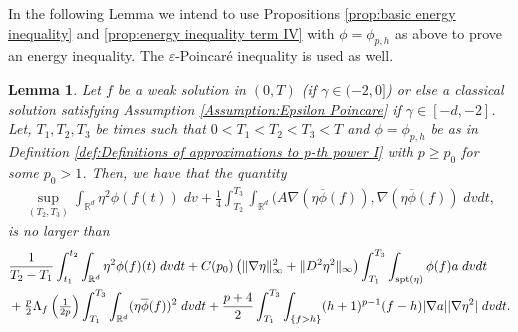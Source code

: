 \documentclass[12pt,american]{amsart}
\numberwithin{equation}{section}
\theoremstyle{plain}
\newtheorem{lem}[thm]{Lemma}
\theoremstyle{definition}                  %
\begin{document}
  In the following Lemma we intend to use Propositions \ref{prop:basic energy inequality} and \ref{prop:energy inequality term IV} with $\phi = \phi_{p,h}$ as above to prove an energy inequality. The $\varepsilon$-Poincar\'e inequality is used as well.
  \begin{lem}\label{lem:energy inequality with bad term} 
    Let $f$ be a weak solution in $(0,T)$ (if $\gamma \in (-2,0]$) or else a classical solution satisfying Assumption \ref{Assumption:Epsilon Poincare} if $\gamma \in [-d,-2]$. Let, $T_1,T_2,T_3$ be times such that $0<T_1<T_2<T_3<T$ and $\phi=\phi_{p,h}$ be as in Definition \ref{def:Definitions of approximations to p-th power I} with $p\geq p_0$ for some $p_0>1$. Then, we have that the quantity
    \begin{align*}
      \sup \limits_{(T_2,T_3)}\int_{\mathbb{R}^d}\eta^2 \phi(f(t))\;dv+\frac{1}{4}\int_{T_2}^{T_3}\int_{\mathbb{R}^d}(A\nabla (\eta \overline{\phi}(f)),\nabla (\eta \overline{\phi}(f) )\;dvdt,
    \end{align*}
    is no larger than
    \begin{align*}
      & \frac{1}{T_2-T_1}\int_{t_1}^{t_2}\int_{\mathbb{R}^d}\eta^2 \phi(f)(t)\;dvdt +C(p_0)\left (\|\nabla \eta\|_\infty^2+\|D^2\eta^2\|_\infty \right )\int_{T_1}^{T_3}\int_{\textnormal{spt}(\eta)}\phi(f)a\;dvdt\\
      & +\tfrac{p}{2}\Lambda_f\left (\tfrac{1}{2p}\right)\int_{T_1}^{T_3}\int_{\mathbb{R}^d}(\eta \overline{\phi}(f))^2\;dvdt+\frac{p+4}{2}\int_{T_1}^{T_3}\int_{\{f>h\}} (h+1)^{p-1}(f-h)|\nabla a||\nabla \eta^2|\;dvdt.	
    \end{align*}
  \end{lem}
\end{document}
